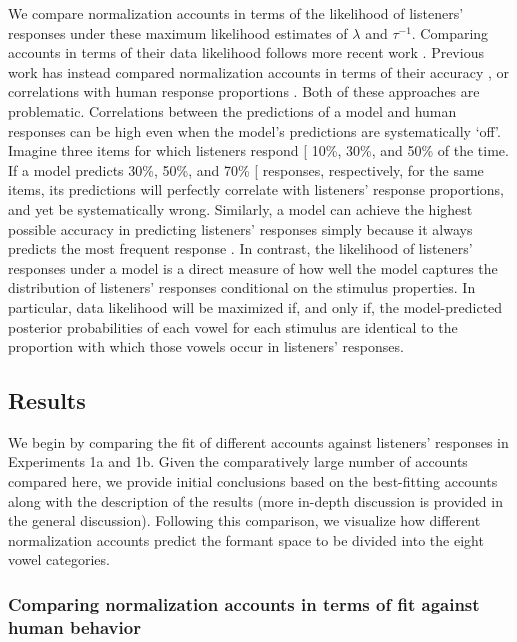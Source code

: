 \documentclass[preprint]{JASA}
\begin{document}
We compare normalization accounts in terms of the likelihood of listeners' responses under these maximum likelihood estimates of \(\lambda\) and \(\tau^{-1}\). Comparing accounts in terms of their data likelihood follows more recent work \citep[e.g.,][]{barreda2021, mcmurray-jongman2011, richter2017, xie2023}. Previous work has instead compared normalization accounts in terms of their accuracy \citep[e.g.,][]{johnson2020, nearey-assmann2007, persson-jaeger2023}, or correlations with human response proportions \citep[e.g.,][]{nearey-assmann1986, hillenbrand-nearey1999}. Both of these approaches are problematic. Correlations between the predictions of a model and human responses can be high even when the model's predictions are systematically `off'. Imagine three items for which listeners respond {[}\ipatext{ɪ}{]} 10\%, 30\%, and 50\% of the time. If a model predicts 30\%, 50\%, and 70\% {[}\ipatext{ɪ}{]} responses, respectively, for the same items, its predictions will perfectly correlate with listeners' response proportions, and yet be systematically wrong. Similarly, a model can achieve the highest possible accuracy in predicting listeners' responses simply because it always predicts the most frequent response \citep[see discussion of criterion choice rule in][]{massaro-friedman1990}. In contrast, the likelihood of listeners' responses under a model is a direct measure of how well the model captures the distribution of listeners' responses conditional on the stimulus properties. In particular, data likelihood will be maximized if, and only if, the model-predicted posterior probabilities of each vowel for each stimulus are identical to the proportion with which those vowels occur in listeners' responses.

\subsection{Results}\label{results}

We begin by comparing the fit of different accounts against listeners' responses in Experiments 1a and 1b. Given the comparatively large number of accounts compared here, we provide initial conclusions based on the best-fitting accounts along with the description of the results (more in-depth discussion is provided in the general discussion). Following this comparison, we visualize how different normalization accounts predict the formant space to be divided into the eight vowel categories.

\subsubsection{Comparing normalization accounts in terms of fit against human behavior}\label{comparing-normalization-accounts-in-terms-of-fit-against-human-behavior}
\end{document}
